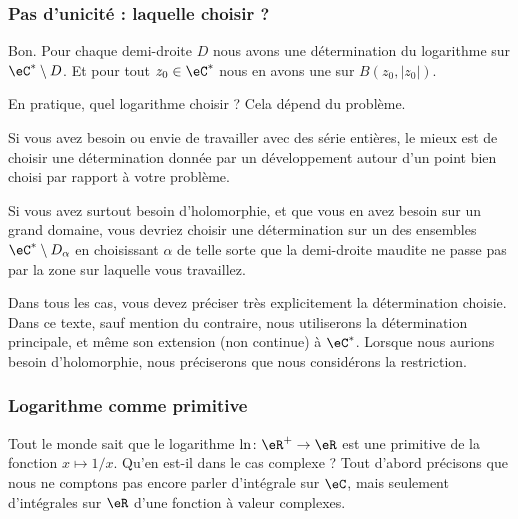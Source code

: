 \subsubsection{Pas d'unicité : laquelle choisir ?}

Bon. Pour chaque demi-droite \( D\) nous avons une détermination du logarithme sur \( \eC^*\setminus D\). Et pour tout \( z_0\in \eC^*\) nous en avons une sur \( B(z_0,| z_0 |)\).

En pratique, quel logarithme choisir ? Cela dépend du problème.

Si vous avez besoin ou envie de travailler avec des série entières, le mieux est de choisir une détermination donnée par un développement autour d'un point bien choisi par rapport à votre problème.

Si vous avez surtout besoin d'holomorphie, et que vous en avez besoin sur un grand domaine, vous devriez choisir une détermination sur un des ensembles \( \eC^*\setminus D_{\alpha}\) en choisissant \( \alpha\) de telle sorte que la demi-droite maudite ne passe pas par la zone sur laquelle vous travaillez.

Dans tous les cas, vous devez préciser très explicitement la détermination choisie. Dans ce texte, sauf mention du contraire, nous utiliserons la détermination principale, et même son extension (non continue) à \( \eC^*\). Lorsque nous aurions besoin d'holomorphie, nous préciserons que nous considérons la restriction.

\subsubsection{Logarithme comme primitive}

Tout le monde sait que le logarithme \( \ln\colon \eR^+\to \eR\) est une primitive de la fonction \( x\mapsto 1/x\). Qu'en est-il dans le cas complexe ? Tout d'abord précisons que nous ne comptons pas encore parler d'intégrale sur \( \eC\), mais seulement d'intégrales sur \( \eR\) d'une fonction à valeur complexes.

